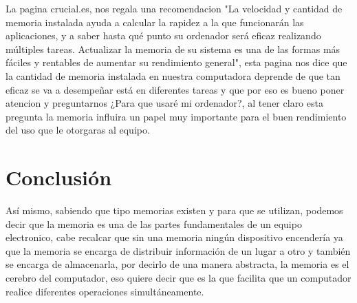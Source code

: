 \documentclass{article}
\begin{document}
La pagina crucial.es, nos regala una recomendacion \cite{uso} "La velocidad y cantidad de memoria instalada ayuda a calcular la rapidez a la que funcionarán las aplicaciones, y a saber hasta qué punto su ordenador será eficaz realizando múltiples tareas. Actualizar la memoria de su sistema es una de las formas más fáciles y rentables de aumentar su rendimiento general", esta pagina nos dice que la cantidad de memoria instalada en nuestra computadora deprende de que tan eficaz se va a desempeñar está en diferentes tareas y que por eso es bueno poner atencion y preguntarnos ¿Para que usaré mi ordenador?, al tener claro esta pregunta la memoria influira un papel muy importante para el buen rendimiento del uso que le otorgaras al equipo.

\section{Conclusión} \label{conclulsion}

Así mismo, sabiendo que tipo memorias existen y para que se utilizan, podemos decir que la memoria es una de las partes fundamentales de un equipo electronico, cabe recalcar que sin una memoria ningún dispositivo encendería ya que la memoria se encarga de distribuir información de un lugar a otro y también se encarga de almacenarla, por decirlo de una manera abstracta, la memoria es el cerebro del computador, eso quiere decir que es la que facilita que un computador realice diferentes operaciones simultáneamente. \newline



\printbibliography
\end{document}
